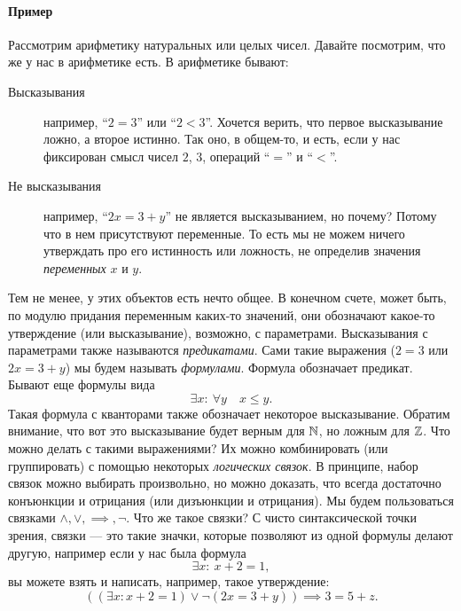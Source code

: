 \paragraph{Пример} Рассмотрим арифметику натуральных или целых чисел.
Давайте посмотрим, что же у нас в арифметике есть.
В арифметике бывают:
\begin{description}
    \item[Высказывания] например, \enquote{$2 = 3$} или \enquote{$2 < 3$}.
    Хочется верить, что первое высказывание ложно, а второе истинно.
    Так оно, в общем-то, и есть, если у нас фиксирован смысл чисел $2$, $3$, операций \enquote{$=$} и \enquote{$<$}.
    \item[Не высказывания] например, \enquote{$2x = 3 + y$} не является высказыванием, но почему?
    Потому что в нем присутствуют переменные.
    То есть мы не можем ничего утверждать про его истинность или ложность, не определив значения {\it переменных} $x$ и $y$.
\end{description}
Тем не менее, у этих объектов есть нечто общее.
В конечном счете, может быть, по модулю придания переменным каких-то значений, они обозначают какое-то утверждение (или высказывание), возможно, с параметрами.
Высказывания с параметрами также называются {\it предикатами}.
Сами такие выражения ($2 = 3$ или $2x = 3 + y$) мы будем называть {\it формулами}.
Формула обозначает предикат.
Бывают еще формулы вида
\begin{equation} \label{eq::06::01}
    \exists x \colon \ \forall y \quad x \leqslant y.
\end{equation}
Такая формула с кванторами также обозначает некоторое высказывание.
Обратим внимание, что вот это высказывание будет верным для $\mathbb{N}$, но ложным для $\mathbb{Z}$.
Что можно делать с такими выражениями?
Их можно комбинировать (или группировать) с помощью некоторых {\it логических связок}.
В принципе, набор связок можно выбирать произвольно, но можно доказать, что всегда достаточно конъюнкции и отрицания (или дизъюнкции и отрицания).
Мы будем пользоваться связками $\land, \lor, \implies, \neg$.
Что же такое связки?
С чисто синтаксической точки зрения, связки --- это такие значки, которые позволяют из одной формулы делают другую, например если у нас была формула
\begin{equation} \label{eq::06::02}
    \exists x \colon \ x + 2 = 1,
\end{equation}
вы можете взять и написать, например, такое утверждение:
\begin{equation}
    ((\exists x \colon x + 2 = 1) \lor \neg (2x = 3 + y)) \implies 3 = 5 + z.
\end{equation}

